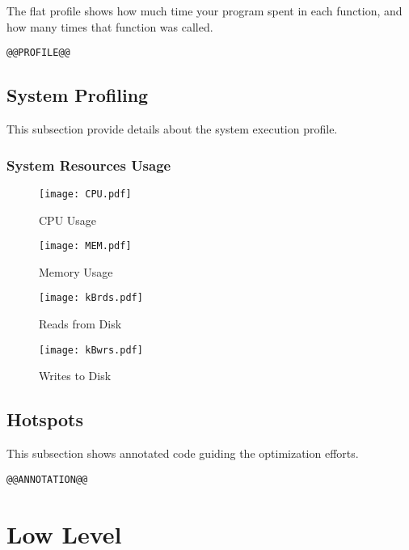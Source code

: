 \documentclass[a4paper]{article}
\begin{document}
The flat profile shows how much time your program spent in each function, and how many times that function was called.

\begin{verbatim}
@@PROFILE@@
\end{verbatim}

\subsection{System Profiling}

This subsection provide details about the system execution profile.

\subsubsection{System Resources Usage}

\begin{figure}[H]
\label{fig:cpu}
\centering
\texttt{[image: CPU.pdf]}
\caption{CPU Usage}
\end{figure}

\begin{figure}[H]
\label{fig:memory}
\centering
\texttt{[image: MEM.pdf]}
\caption{Memory Usage}
\end{figure}

\begin{figure}[H]
\label{fig:reads}
\centering
\texttt{[image: kBrds.pdf]}
\caption{Reads from Disk}
\end{figure}

\begin{figure}[H]
\label{fig:writes}
\centering
\texttt{[image: kBwrs.pdf]}
\caption{Writes to Disk}
\end{figure}

\subsection{Hotspots}

This subsection shows annotated code guiding the optimization efforts.

\begin{verbatim}
@@ANNOTATION@@
\end{verbatim}

\section{Low Level}
\end{document}
